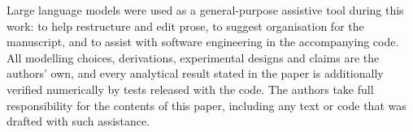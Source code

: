 Large language models were used as a general-purpose assistive tool during this
work: to help restructure and edit prose, to suggest organisation for the
manuscript, and to assist with software engineering in the accompanying code.
All modelling choices, derivations, experimental designs and claims are the
authors' own, and every analytical result stated in the paper is additionally
verified numerically by tests released with the code. The authors take full
responsibility for the contents of this paper, including any text or code that
was drafted with such assistance.

